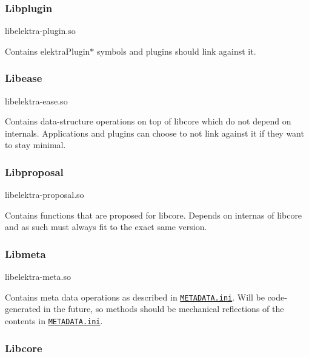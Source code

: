 \subsubsection*{Libplugin}

\begin{DoxyVerb}libelektra-plugin.so
\end{DoxyVerb}


Contains elektra\+Plugin$\ast$ symbols and plugins should link against it.

\subsubsection*{Libease}

\begin{DoxyVerb}libelektra-ease.so
\end{DoxyVerb}


Contains data-\/structure operations on top of libcore which do not depend on internals. Applications and plugins can choose to not link against it if they want to stay minimal.

\subsubsection*{Libproposal}

\begin{DoxyVerb}libelektra-proposal.so
\end{DoxyVerb}


Contains functions that are proposed for libcore. Depends on internas of libcore and as such must always fit to the exact same version.

\subsubsection*{Libmeta}

\begin{DoxyVerb}libelektra-meta.so
\end{DoxyVerb}


Contains meta data operations as described in \href{/home/markus/Projekte/Elektra/current/doc/METADATA.ini}{\tt M\+E\+T\+A\+D\+A\+T\+A.\+ini}. Will be code-\/generated in the future, so methods should be mechanical reflections of the contents in \href{/home/markus/Projekte/Elektra/current/doc/METADATA.ini}{\tt M\+E\+T\+A\+D\+A\+T\+A.\+ini}.

\subsubsection*{Libcore}

